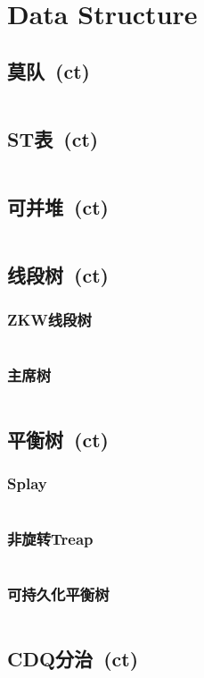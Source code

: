 \chapter{Data Structure}
\section{莫队\ \small(ct)}
\inputminted{cpp}{DataStructure/mo_dui.cpp}
\section{ST表\ \small(ct)}
\inputminted{cpp}{DataStructure/st_table.cpp}
\section{可并堆\ \small(ct)}
\inputminted{cpp}{DataStructure/mergeable_heap.cpp}
\section{线段树\ \small(ct)}
\subsection{ZKW线段树}
\inputminted{cpp}{DataStructure/zkw_segment_tree.cpp}
\subsection{主席树}
\inputminted{cpp}{DataStructure/chair_tree.cpp}
\section{平衡树\ \small(ct)}
\subsection{Splay}
\inputminted{cpp}{DataStructure/splay.cpp}
\subsection{非旋转Treap}
\inputminted{cpp}{DataStructure/treap_unrotated.cpp}
\subsection{可持久化平衡树}
\inputminted{cpp}{DataStructure/functional_treap.cpp}
\section{CDQ分治\ \small(ct)}
\inputminted{cpp}{DataStructure/cdq_divide.cpp}